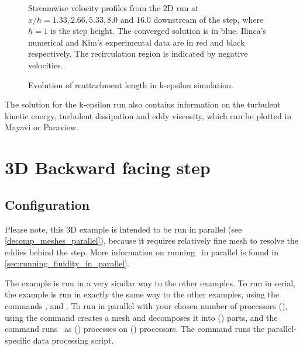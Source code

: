 \begin{figure}
\centering
{}
\caption{Streamwise velocity profiles from the 2D run at $x/h=1.33, 2.66, 5.33, 8.0 \text{ and } 16.0$
downstream of the step, where $h=1$ is the step height. The converged solution is in blue.
Ilinca's numerical and Kim's experimental data \citep{ilinca_97} are in red and black respectively.
The recirculation region is indicated by negative velocities.}
\label{Fig:UProfiles2d}
\end{figure}

\begin{figure}
\centering
{}
\caption{Evolution of reattachment length in k-epsilon simulation.}
\label{Fig:RL2d}
\end{figure}

The solution for the k-epsilon run also contains information on the turbulent kinetic energy, turbulent dissipation and eddy viscosity, which can be plotted in Mayavi or Paraview.


\section{3D Backward facing step}
\label{sec:backward_facing_step_3d}

\subsection{Configuration}
Please note, this 3D example is intended to be run in parallel (see \ref{decomp_meshes_parallel}),
because it requires relatively fine mesh to resolve the eddies behind the step.
More information on running \fluidity\ in parallel is found in \ref{sec:running_fluidity_in_parallel}.

The example is run in a very similar way to the other examples.
To run in serial, the example is run in exactly the same way to the other examples, using
the commands ,  and .
To run in parallel with your chosen number of processors (), using the command
 creates a mesh and decomposes it into () parts, and
the command  runs \fluidity\ as () processes on () processors.
The command  runs the parallel-specific data processing script.

